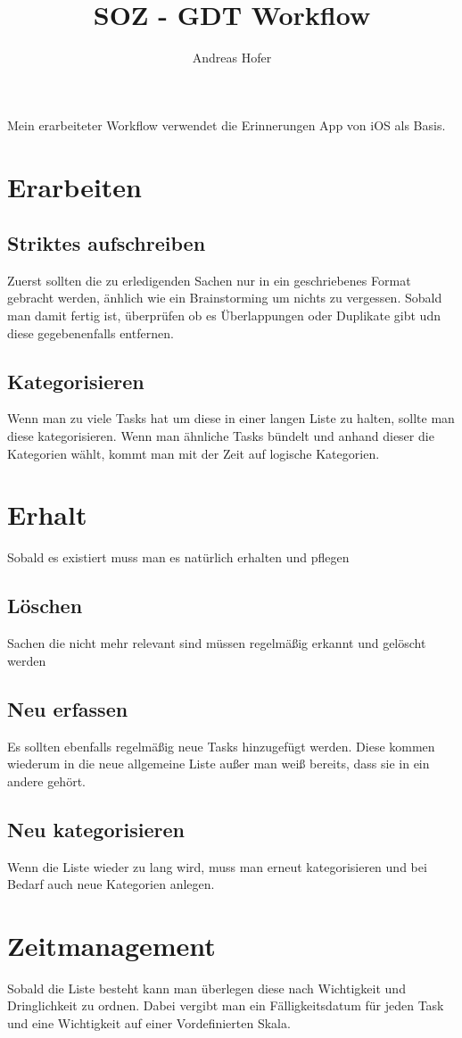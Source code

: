 \documentclass{article}
\title{\vspace{-1cm}SOZ - GDT Workflow}
\author{Andreas Hofer}
\begin{document}
	\maketitle
	Mein erarbeiteter Workflow verwendet die Erinnerungen App von iOS als Basis.
	\section{Erarbeiten}
	\subsection{Striktes aufschreiben}
	Zuerst sollten die zu erledigenden Sachen nur in ein geschriebenes Format gebracht werden, änhlich wie ein Brainstorming um nichts zu vergessen. Sobald man damit fertig ist, überprüfen ob es Überlappungen oder Duplikate gibt udn diese gegebenenfalls entfernen.
	\subsection{Kategorisieren}
	Wenn man zu viele Tasks hat um diese in einer langen Liste zu halten, sollte man diese kategorisieren. Wenn man ähnliche Tasks bündelt und anhand dieser die Kategorien wählt, kommt man mit der Zeit auf logische Kategorien.
	\section{Erhalt}
	Sobald es existiert muss man es natürlich erhalten und pflegen
	\subsection{Löschen}
	Sachen die nicht mehr relevant sind müssen regelmäßig erkannt und gelöscht werden
	\subsection{Neu erfassen}
	Es sollten ebenfalls regelmäßig neue Tasks hinzugefügt werden. Diese kommen wiederum in die neue allgemeine Liste außer man weiß bereits, dass sie in ein andere gehört.
	\subsection{Neu kategorisieren}
	Wenn die Liste wieder zu lang wird, muss man erneut kategorisieren und bei Bedarf auch neue Kategorien anlegen.
	\section{Zeitmanagement}
	Sobald die Liste besteht kann man überlegen diese nach Wichtigkeit und Dringlichkeit zu ordnen. Dabei vergibt man ein Fälligkeitsdatum für jeden Task und eine Wichtigkeit auf einer Vordefinierten Skala.























  
\end{document}

